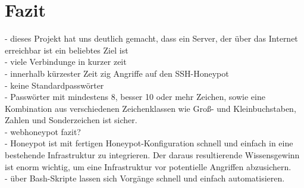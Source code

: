 \chapter{Fazit}
\label{ch:Fazit}

- dieses Projekt hat uns deutlich gemacht, dass ein Server, der über das Internet erreichbar ist ein beliebtes Ziel ist\\
- viele Verbindunge in kurzer zeit\\
- innerhalb kürzester Zeit zig Angriffe auf den SSH-Honeypot\\
- keine Standardpasswörter\\
- Passwörter mit mindestens 8, besser 10 oder mehr Zeichen, sowie eine Kombination aus verschiedenen Zeichenklassen wie Groß- und Kleinbuchstaben, Zahlen und Sonderzeichen ist sicher.\\

- webhoneypot fazit?\\

- Honeypot ist mit fertigen Honeypot-Konfiguration schnell und einfach in eine bestehende Infrastruktur zu integrieren. Der daraus resultierende Wissensgewinn ist enorm wichtig, um eine Infrastruktur vor potentielle Angriffen abzusichern.\\

- über Bash-Skripte lassen sich Vorgänge schnell und einfach automatisieren.\\
